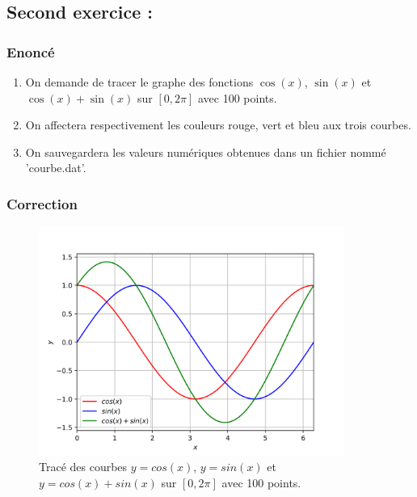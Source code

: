 \documentclass[a4paper,12pt]{article}
\begin{document}
\clearpage
\subsection{Second exercice :}
\subsubsection{Enonc\'e}
\begin{leftbar}
\begin{enumerate}
\item On demande de tracer le graphe des fonctions $\cos(x)$, $\sin(x)$ et $\cos(x)+\sin(x)$ sur $[0,2\pi]$ avec 100 points. 
\item On affectera respectivement les couleurs rouge, vert et bleu aux trois courbes. 
\item On sauvegardera les valeurs num\'eriques obtenues dans un fichier nomm\'e 'courbe.dat'.
\end{enumerate}
\end{leftbar}
\subsubsection{Correction}


\begin{figure}[h]
\begin{center}
\includegraphics[width=10cm]{./png/trigo}
\end{center}
\caption{Trac\'e des courbes $y=cos(x)$, $y=sin(x)$ et $y=cos(x)+sin(x)$ sur $[0,2\pi]$ avec 100 points.}
\end{figure}

\clearpage
\end{document}
